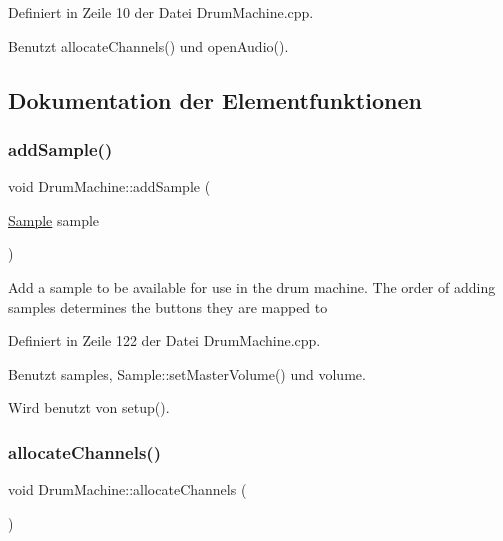 Definiert in Zeile 10 der Datei Drum\+Machine.\+cpp.



Benutzt allocate\+Channels() und open\+Audio().



\subsection{Dokumentation der Elementfunktionen}
\mbox{\label{class_drum_machine_a530ac2c3529492c62a01619786fb3765}} 
\subsubsection{\texorpdfstring{add\+Sample()}{addSample()}}
{\footnotesize\ttfamily void Drum\+Machine\+::add\+Sample (\begin{DoxyParamCaption}\item[{\hyperlink{class_sample}{Sample}}]{sample }\end{DoxyParamCaption})}

Add a sample to be available for use in the drum machine. The order of adding samples determines the buttons they are mapped to 

Definiert in Zeile 122 der Datei Drum\+Machine.\+cpp.



Benutzt samples, Sample\+::set\+Master\+Volume() und volume.



Wird benutzt von setup().

\mbox{\label{class_drum_machine_a5a42497c3a1f390537b6c12fddab1619}} 
\subsubsection{\texorpdfstring{allocate\+Channels()}{allocateChannels()}}
{\footnotesize\ttfamily void Drum\+Machine\+::allocate\+Channels (\begin{DoxyParamCaption}{ }\end{DoxyParamCaption})\hspace{0.3cm}{\ttfamily [private]}}



